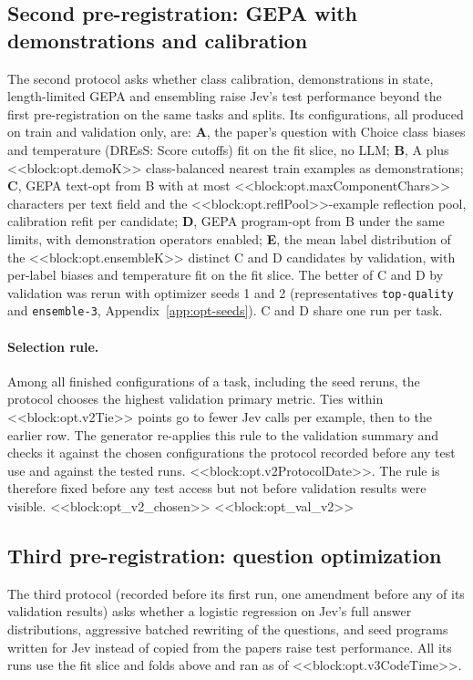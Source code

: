 \subsection{Second pre-registration: GEPA with demonstrations and calibration}\label{app:opt-v2}
The second protocol asks whether class calibration, demonstrations in state, length-limited GEPA and ensembling raise Jev's test performance beyond the first pre-registration on the same tasks and splits. Its configurations, all produced on train and validation only, are: \textbf{A}, the paper's question with Choice class biases and temperature (DREsS: Score cutoffs) fit on the fit slice, no LLM; \textbf{B}, A plus <<block:opt.demoK>> class-balanced nearest train examples as demonstrations; \textbf{C}, GEPA text-opt from B with at most <<block:opt.maxComponentChars>> characters per text field and the <<block:opt.reflPool>>-example reflection pool, calibration refit per candidate; \textbf{D}, GEPA program-opt from B under the same limits, with demonstration operators enabled; \textbf{E}, the mean label distribution of the <<block:opt.ensembleK>> distinct C and D candidates by validation, with per-label biases and temperature fit on the fit slice. The better of C and D by validation was rerun with optimizer seeds 1 and 2 (representatives \texttt{top-quality} and \texttt{ensemble-3}, Appendix~\ref{app:opt-seeds}). C and D share one run per task.

\paragraph{Selection rule.}
Among all finished configurations of a task, including the seed reruns, the protocol chooses the highest validation primary metric. Ties within <<block:opt.v2Tie>> points go to fewer Jev calls per example, then to the earlier row. The generator re-applies this rule to the validation summary and checks it against the chosen configurations the protocol recorded before any test use and against the tested runs. <<block:opt.v2ProtocolDate>>. The rule is therefore fixed before any test access but not before validation results were visible.
<<block:opt_v2_chosen>>
<<block:opt_val_v2>>

\subsection{Third pre-registration: question optimization}\label{app:opt-v3}
The third protocol (recorded before its first run, one amendment before any of its validation results) asks whether a logistic regression on Jev's full answer distributions, aggressive batched rewriting of the questions, and seed programs written for Jev instead of copied from the papers raise test performance. All its runs use the fit slice and folds above and ran \jevopt{} as of <<block:opt.v3CodeTime>>.

